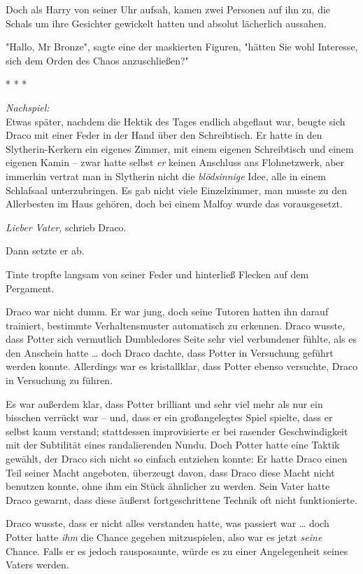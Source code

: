 {Doch als Harry von seiner Uhr aufsah, kamen zwei Personen auf ihn zu, die Schals um ihre Gesichter gewickelt hatten und absolut lächerlich aussahen.

"Hallo, Mr Bronze", sagte eine der maskierten Figuren, "hätten Sie wohl Interesse, sich dem Orden des Chaos anzuschließen?"

* * *

\emph{Nachspiel:}\\ Etwas später, nachdem die Hektik des Tages endlich abgeflaut war, beugte sich Draco mit einer Feder in der Hand über den Schreibtisch. Er hatte in den Slytherin-Kerkern ein eigenes Zimmer, mit einem eigenen Schreibtisch und einem eigenen Kamin -- zwar hatte selbst \emph{er} keinen Anschluss ans Flohnetzwerk, aber immerhin vertrat man in Slytherin nicht die \emph{blödsinnige} Idee, alle in einem Schlafsaal unterzubringen. Es gab nicht viele Einzelzimmer, man musste zu den Allerbesten im Haus gehören, doch bei einem Malfoy wurde das vorausgesetzt.

\emph{Lieber Vater,} schrieb Draco.

Dann setzte er ab.

Tinte tropfte langsam von seiner Feder und hinterließ Flecken auf dem Pergament.

Draco war nicht dumm. Er war jung, doch seine Tutoren hatten ihn darauf trainiert, bestimmte Verhaltensmuster automatisch zu erkennen. Draco wusste, dass Potter sich vermutlich Dumbledores Seite sehr viel verbundener fühlte, als es den Anschein hatte … doch Draco dachte, dass Potter in Versuchung geführt werden konnte. Allerdings war es kristallklar, dass Potter ebenso versuchte, Draco in Versuchung zu führen.

Es war außerdem klar, dass Potter brilliant und sehr viel mehr als nur ein bisschen verrückt war -- und, dass er ein großangelegtes Spiel spielte, dass er selbst kaum verstand; stattdessen improvisierte er bei rasender Geschwindigkeit mit der Subtilität eines randalierenden Nundu. Doch Potter hatte eine Taktik gewählt, der Draco sich nicht so einfach entziehen konnte: Er hatte Draco einen Teil seiner Macht angeboten, überzeugt davon, dass Draco diese Macht nicht benutzen konnte, ohne ihm ein Stück ähnlicher zu werden. Sein Vater hatte Draco gewarnt, dass diese äußerst fortgeschrittene Technik oft nicht funktionierte.

Draco wusste, dass er nicht alles verstanden hatte, was passiert war … doch Potter hatte \emph{ihm} die Chance gegeben mitzuspielen, also war es jetzt \emph{seine} Chance. Falls er es jedoch rausposaunte, würde es zu einer Angelegenheit seines Vaters werden.

}
